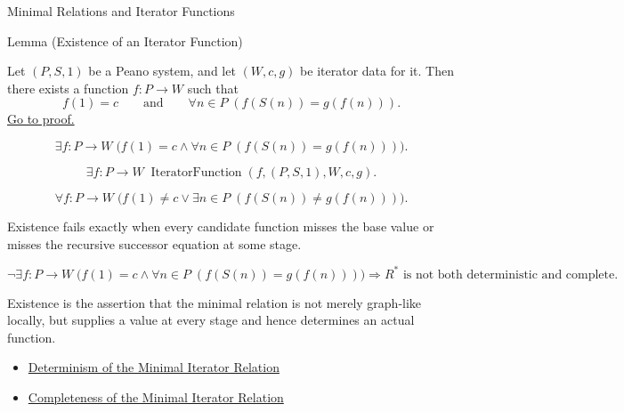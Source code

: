 \begin{topicbox}{Minimal Relations and Iterator Functions}
\begin{lemmabox}{Lemma (Existence of an Iterator Function)}
\begin{lemma}
\label{lem:existence-of-iterator-function}
Let $(P,S,1)$ be a Peano system, and let $(W,c,g)$ be iterator data for it.
Then there exists a function $f:P\to W$ such that
\[
f(1)=c
\qquad\text{and}\qquad
\forall n\in P\;(f(S(n))=g(f(n))).
\]
\hyperref[prf:existence-of-iterator-function]{Go to proof.}
\end{lemma}
\end{lemmabox}

\begin{remark*}
\[
\exists f:P\to W\;
\bigl(f(1)=c\land \forall n\in P\;(f(S(n))=g(f(n)))\bigr).
\]
\end{remark*}

\begin{remark*}
\[
\exists f:P\to W\;
\operatorname{IteratorFunction}(f,(P,S,1),W,c,g).
\]
\end{remark*}

\begin{remark*}
\[
\forall f:P\to W\;
\bigl(f(1)\neq c\lor \exists n\in P\;(f(S(n))\neq g(f(n)))\bigr).
\]
\end{remark*}

\begin{remark*}
Existence fails exactly when every candidate function misses the base value or
misses the recursive successor equation at some stage.
\end{remark*}

\begin{remark*}
\[
\neg\exists f:P\to W\;
\bigl(f(1)=c\land \forall n\in P\;(f(S(n))=g(f(n)))\bigr)
\Longrightarrow
R^* \text{ is not both deterministic and complete}.
\]
\end{remark*}

\begin{remark*}[Interpretation]
Existence is the assertion that the minimal relation is not merely graph-like
locally, but supplies a value at every stage and hence determines an actual
function.
\end{remark*}

\begin{dependencies}
\begin{itemize}
  \item \hyperref[lem:minimal-iterator-relation-deterministic]{Determinism of the Minimal Iterator Relation}
  \item \hyperref[lem:minimal-iterator-relation-complete]{Completeness of the Minimal Iterator Relation}
\end{itemize}
\end{dependencies}


\end{topicbox}
